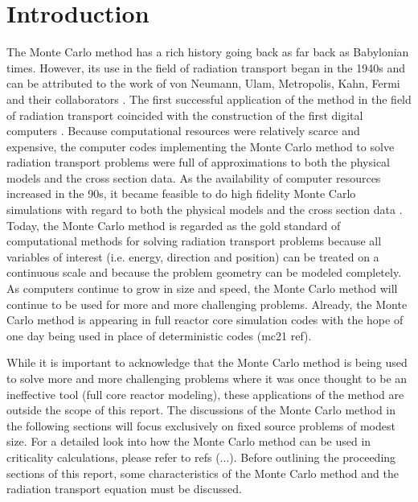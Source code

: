 \chapter{Introduction}
\label{ch:introduction}
The Monte Carlo method has a rich history going back as far back as Babylonian 
times. However, its use in the field of radiation transport began in the 1940s and can 
be attributed to the work of von Neumann, Ulam, Metropolis, Kahn, Fermi and 
their collaborators \citep{halton_retrospective_1970}. The first successful 
application of the method in the field of radiation transport coincided with 
the construction of the first digital computers \citep{lux_monte_1991}. Because 
computational resources were relatively scarce and expensive, the computer codes
implementing the Monte Carlo method to solve radiation transport problems were
full of approximations to both the physical models and the cross section data.
As the availability of computer resources increased in the 90s, it became 
feasible to do high fidelity Monte Carlo simulations with regard to both the 
physical models and the cross section data \citep{chucas_preparing_1994}. Today,
the Monte Carlo method is regarded as the gold standard of computational 
methods for solving radiation transport problems because all variables of 
interest (i.e. energy, direction and position) can be treated on a continuous
scale and because the problem geometry can be modeled completely. As 
computers continue to grow in size and speed, the Monte Carlo method will 
continue to be used for more and more challenging problems. Already, the Monte
Carlo method is appearing in full reactor core simulation codes with the hope
of one day being used in place of deterministic codes (mc21 ref).

While it is important to acknowledge that the Monte Carlo method is being 
used to solve more and more challenging problems where it was once thought to 
be an ineffective tool (full core reactor modeling), these applications of the 
method are outside the scope of this report. The discussions of the Monte Carlo
method in the following sections will focus exclusively on fixed source 
problems of modest size. For a detailed look into how the Monte Carlo method 
can be used in criticality calculations, please refer to refs (...). Before 
outlining the proceeding sections of this report, some characteristics of the 
Monte Carlo method and the radiation transport equation must be discussed.

